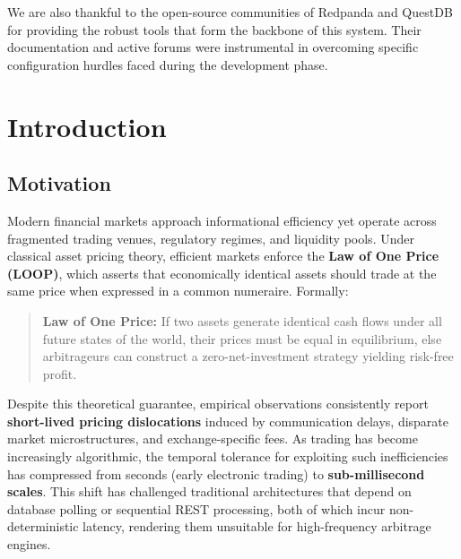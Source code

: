 \documentclass[letterpaper,11pt]{report}
\begin{document}
We are also thankful to the open-source communities of Redpanda and QuestDB for providing the robust tools that form the backbone of this system. Their documentation and active forums were instrumental in overcoming specific configuration hurdles faced during the development phase.

\vspace{2in}

\newpage

\tableofcontents
\newpage


\chapter{Introduction}

\section{Motivation}

Modern financial markets approach informational efficiency yet operate across fragmented trading venues, regulatory regimes, and liquidity pools. 
Under classical asset pricing theory, efficient markets enforce the \textbf{Law of One Price (LOOP)}, which asserts that economically identical assets should trade at the same price when expressed in a common numeraire.  
Formally:

\begin{quote}
    \textbf{Law of One Price:}  
    If two assets generate identical cash flows under all future states of the world, their prices must be equal in equilibrium, 
    else arbitrageurs can construct a zero-net-investment strategy yielding risk-free profit.
\end{quote}

Despite this theoretical guarantee, empirical observations consistently report \textbf{short-lived pricing dislocations} induced by communication delays, disparate market microstructures, and exchange-specific fees. 
As trading has become increasingly algorithmic, the temporal tolerance for exploiting such inefficiencies has compressed from seconds (early electronic trading) to \textbf{sub-millisecond scales}.  
This shift has challenged traditional architectures that depend on database polling or sequential REST processing, both of which incur non-deterministic latency, rendering them unsuitable for high-frequency arbitrage engines.
\end{document}

